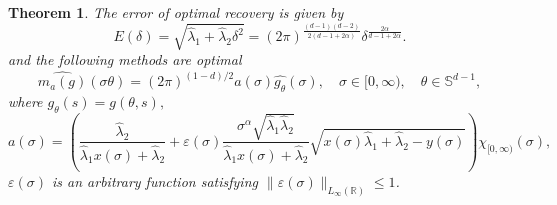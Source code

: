 \documentclass[12pt]{iopart}
\newtheorem{theorem}{Theorem}
\begin{document}
\begin{theorem}
\label{theorem3.1}
The error of optimal recovery is given by
  \[
E(\delta)=\sqrt{\widehat\lambda_1+\widehat\lambda_2\delta^2}=(2\pi)^{\frac{(d-1)(d-2)}{2(d-1+2\alpha)}}\delta^{\frac{2\alpha}{d-1+2\alpha}}.
\]
and the following methods are optimal
 \begin{equation}
\label{method}
  \widehat{m_a(g)}(\sigma\theta )=(2\pi)^{(1-d)/2}a(\sigma)\widehat{g_\theta }(\sigma),\quad \sigma\in[0,\infty),\quad\theta\in\mathbb S^{d-1},
\end{equation}
where $g_\theta (s)=g(\theta ,s),$
  \begin{equation}
  \label{a3.1}
  a(\sigma)=\left(\frac{\widehat\lambda_2}{\widehat\lambda_1x(\sigma)+\widehat\lambda_2}+\varepsilon(\sigma)\frac{\sigma^\alpha\sqrt{\widehat\lambda_1\widehat\lambda_2}}{\widehat\lambda_1x(\sigma)+\widehat\lambda_2}\sqrt{x(\sigma)\widehat\lambda_1+\widehat\lambda_2-y(\sigma)}\right)\chi_{[0,\infty)}(\sigma),
  \end{equation}
  $\varepsilon(\sigma)$ is an arbitrary function satisfying $\|\varepsilon(\sigma)\|_{L_\infty(\mathbb R)}\le 1$.
\end{theorem}
\end{document}
